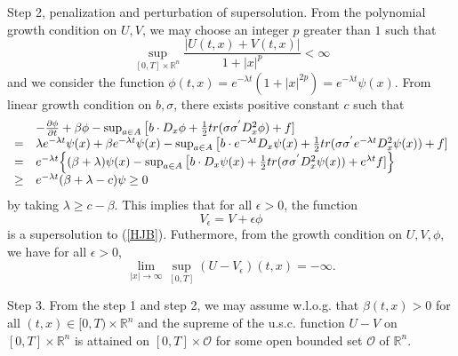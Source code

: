 \documentclass[12pt,a4paper]{ctexart}
\begin{document}
Step 2, penalization and perturbation of supersolution. From the polynomial growth condition on $U, V$, we may choose an integer $p$ greater than $1$ such that
\begin{equation*}
    \sup_{[0, T] \times \mathbb{R}^{n}} \frac{|U(t,x) + V(t,x)|}{1 + |x|^{p}} < \infty
\end{equation*}
and we consider the function $\phi(t,x) = e^{-\lambda t} (1 + |x|^{2p}) = e^{-\lambda t} \psi(x)$. From linear growth condition on $b, \sigma$, there exists positive constant $c$ such that
$$\begin{array}
{ll}
& - \frac{\partial \phi}{\partial t} + \beta \phi - \sup_{a \in A} \big{[} b \cdot D_{x} \phi + \frac{1}{2} tr(\sigma \sigma^{'} D_{x}^{2} \phi) + f]
\\ = &
 \lambda e^{-\lambda t} \psi(x) + \beta e^{-\lambda t} \psi(x) - \sup_{a \in A} \big{[} b \cdot e^{-\lambda t} D_{x} \psi(x) + \frac{1}{2} tr(\sigma \sigma^{'} e^{-\lambda t} D_{x}^{2}\psi(x)) + f]
\\ = & 
e^{-\lambda t} \Big{\{} (\beta + \lambda) \psi(x) - \sup_{a \in A} \big{[} b \cdot  D_{x} \psi(x) + \frac{1}{2} tr(\sigma \sigma^{'} D_{x}^{2}\psi(x)) + e^{\lambda t} f] \Big{\}} 
\\ \geq &
e^{-\lambda t} (\beta + \lambda - c ) \psi \geq 0
\end{array}
$$
by taking $\lambda \geq c - \beta$. This implies that for all $\epsilon > 0$, the function
\begin{equation*}
    V_{\epsilon} = V + \epsilon \phi
\end{equation*}
is a supersolution to (\ref{HJB}). Futhermore, from the growth condition on $U, V, \phi$, we have for all $\epsilon > 0$,
\begin{equation*}
    \lim_{|x| \to \infty} \sup_{[0, T]} (U - V_{\epsilon}) (t,x) = - \infty.
\end{equation*}

Step 3. From the step 1 and step 2, we may assume w.l.o.g. that $\beta(t,x) > 0$ for all $(t,x) \in [0, T) \times \mathbb{R}^{n}$ and the supreme of the u.s.c. function $U - V$ on $[0, T] \times \mathbb{R}^{n}$ is attained on $[0, T] \times \mathcal{O}$ for some open bounded set $\mathcal{O}$ of $\mathbb{R}^{n}$. 
\end{document}
